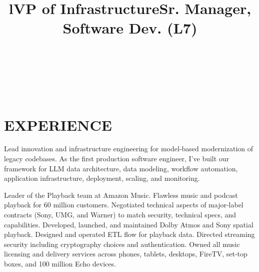 \documentclass[margin]{res}
\begin{document}
\bigskip

\address{2528 Chilton Way\\ken@hero.net}
\address{Berkeley, CA 94704\\(310) 383-7981}

\begin{resume}

\begin{format}
\title{l}\\
\\
\body\\
\end{format}

\section{EXPERIENCE}

\title{\textbf{VP of Infrastructure}}
\begin{position}
  \hspace*{.5cm}Lead innovation and infrastructure engineering for model-based modernization of legacy codebases. As the first production software engineer, I've built our framework for LLM data architecture, data modeling, workflow automation, application infrastructure, deployment, scaling, and monitoring.
\end{position}
\title{\textbf{Sr. Manager, Software Dev. (L7)}}
\begin{position}
\hspace*{.25cm}Leader of the Playback team at Amazon Music. Flawless music and podcast playback for 60 million customers. Negotiated technical aspects of major-label contracts (Sony, UMG, and Warner) to match security, technical specs, and capabilities. Developed, launched, and maintained Dolby Atmos and Sony spatial playback. Designed and operated ETL flow for playback data. Directed streaming security including cryptography choices and authentication. Owned all music licensing and delivery services across phones, tablets, desktops, FireTV, set-top boxes, and 100 million Echo devices. 
\end{position}


\end{resume}
\end{document}
